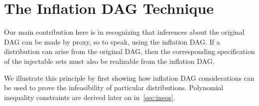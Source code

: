 \section{The Inflation DAG Technique}\label{sec:mainalgorithm}

Our main contribution here is in recognizing that inferences about the original DAG can be made by proxy, so to speak, using the inflation DAG. If a distribution can arise from the original DAG, then the corresponding specification of the injectable sets must also be realizable from the inflation DAG. 

We illustrate this principle by first showing how inflation DAG considerations can be used to prove the infeasibility of particular distributions. Polynomial inequality constraints are derived later on in~\cref{sec:ineqs}.



\par\smallskip\nobreak

